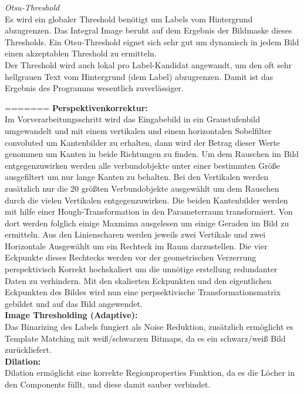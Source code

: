 \documentclass[paper=A4, deutsch]{scrartcl}
\begin{document}
\textit{Otsu-Threshold} \cite{otsu}\\
Es wird ein globaler Threshold benötigt um Labels vom Hintergrund abzugrenzen. Das Integral Image beruht auf dem Ergebnis der Bildmaske dieses Thresholds. Ein Otsu-Threshold eignet sich sehr gut um dynamisch in jedem Bild einen akzeptablen Threshold zu ermitteln.\\
Der Threshold wird auch lokal pro Label-Kandidat angewandt, um den oft sehr hellgrauen Text vom Hintergrund (dem Label) abzugrenzen. Damit ist das Ergebnis des Programms wesentlich zuverlässiger.


=======
\textbf{Perspektivenkorrektur:}\\
Im Vorverarbeitungsschritt wird das Eingabebild in ein Graustufenbild umgewandelt und mit einem vertikalen und einem horizontalen Sobelfilter convoluted um Kantenbilder zu erhalten, dann wird der Betrag dieser Werte genommen um Kanten in beide Richtungen zu finden. Um dem Rauschen im Bild entgegenzuwirken werden alle verbundobjekte unter einer bestimmten Größe ausgefiltert um nur lange Kanten zu behalten. Bei den Vertikalen werden zusätzlich nur die 20 größten Verbundobjekte ausgewählt um dem Rauschen durch die vielen Vertikalen entgegenzuwirken.
Die beiden Kantenbilder werden mit hilfe einer Hough-Transformation in den Parameterraum transformiert. Von dort werden folglich einige Maxmima ausgelesen um einige Geraden im Bild zu ermitteln.
Aus den Linienscharen werden jeweils zwei Vertikale und zwei Horizontale Ausgewählt um ein Rechteck im Raum darzustellen. Die vier Eckpunkte dieses Rechtecks werden vor der geometrischen Verzerrung perspektivisch Korrekt hochskaliert um die unnötige erstellung redundanter Daten zu verhindern. Mit den skalierten Eckpunkten und den eigentlichen Eckpunkten des Bildes wird nun eine perpsektivische Transformationsmatrix gebildet und auf das Bild angewendet.\\

\textbf{Image Thresholding (Adaptive):}\\
Das Binarizing des Labels fungiert als Noise Reduktion, zusätzlich ermöglicht es Template Matching mit weiß/schwarzen Bitmaps, da es ein schwarz/weiß Bild zurückliefert.\\

\textbf{Dilation:}\\
Dilation ermöglicht eine korrekte Regionproperties Funktion, da es die Löcher in den Components füllt, und diese damit sauber verbindet.\\
\end{document}
